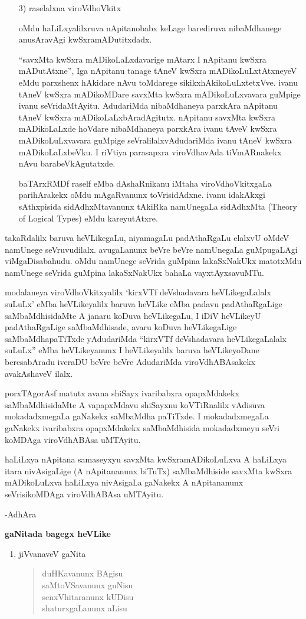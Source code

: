 \begin{itemize}
\item[{\rm 3)}] raselalxna viroVdhoVkitx

oMdu haLiLxyalilxruva nApitanobabx keLage barediruva nibaMdhanege anusAra\-vAgi kwSxramADutitxdadx.

``savxMta kwSxra mADikoLaLxdavarige mAtarx I nApitanu kwSxra mADutAtxne'', Iga nApitanu tanage tAneV kwSxra mADikoLuLxtAtxneyeV eMdu parxshenx hAkidare nAvu toMdarege sikikxhAkikoLuLxtetxVve. ivanu tAneV kwSxra mADikoMDare savxMta kwSxra mADikoLuLxvavara guMpige ivanu seVridaMtAyitu. AdudariMda nibaMdhaneya parxkAra nApitanu tAneV kwSxra mADikoLaLxbAradAgitutx. nApitanu savxMta kwSxra mADikoLaLxde hoVdare nibaMdhaneya parxkAra ivanu tAveV kwSxra mADikoLuLxvavara guMpige seVralilalxvAdudariMda ivanu tAneV kwSxra mADikoLaLxbeVku. I riVtiya parasapxra viroVdhavAda tiVmARnakekx nAvu barabeVkAgutatxde.

baTArxRMDf raself eMba dAshaRnikanu iMtaha viroVdhoVkitxgaLa parihArakekx oMdu mAgaRvanunx toVrisidAdxne. ivanu idakAkxgi sAthxpisida sidAdhxMtavanunx tAkiRka namUnegaLa sidAdhxMta {\rm (Theory of Logical Types)} eMdu kareyutAtxre.
\end{itemize}

takaRdalilx baruva heVLikegaLu, niyamagaLu padAthaRgaLu elalxvU oMdeV namUnege seVruvudilalx. avugaLanunx beVre beVre namUnegaLa guMpugaLAgi viMgaDisabahudu. oMdu namUnege seVrida guMpina lakaSxNakUkx matotxMdu namUnege seVrida guMpina lakaSxNakUkx bahaLa vayxtAyxsavuMTu.

modalaneya viroVdhoVkitxyalilx `kirxVTf deVshadavara heVLikegaLalalx suLuLx' eMba heVLikeyalilx baruva heVLike eMba padavu padAthaRgaLige saMbaMdhisidaMte A janaru koDuva heVLikegaLu, I iDiV heVLikeyU padAthaRgaLige saMbaMdhisade, avaru koDuva heVLikegaLige saMbaMdhapaTiTxde yAdudariMda ``kirxVTf deVshadavara heVLikegaLalalx suLuLx'' eMba heVLikeyanunx I heVLikeyalilx baruva heVLikeyoDane beresabAradu iveraDU beVre beVre AdudariMda viroVdhABAsakekx avakAshaveV ilalx.

porxTAgorAsf matutx avana shiSayx ivaribabxra opapxMdakekx saMbaMdhisidaMte A vapapxMdavu shiSayxnu koVTiRnalilx vAdisuva mokadadxmegaLa gaNakekx saMbaMdha paTiTxde. I mokadadxmegaLa gaNakekx ivaribabxra opapxMdakekx saMbaMdhisida mokadadxmeyu seVri koMDAga viroVdhABAsa uMTAyitu.

haLiLxya nApitana samaseyxyu savxMta kwSxramADikoLuLxva A haLiLxya itara nivAsigaLige (A nApitananunx biTuTx) saMbaMdhiside savxMta kwSxra mADikoLuLxva haLiLxya nivAsigaLa gaNakekx A nApitananunx seVrisikoMDAga viroVdhABAsa uMTAyitu.

\hfill{-AdhAra}

\begin{center}
{\bf gaNitada bagegx heVLike} 
\end{center}

\begin{enumerate}[\rm 1)]
\item jiVvanaveV gaNita
\begin{center}
\begin{verse}
duHKavanunx BAgisu\\
saMtoVSavanunx guNisu\\
senxVhitaranunx kUDisu\\
shaturxgaLanunx aLisu
\end{verse}
\end{center}
\end{enumerate}
